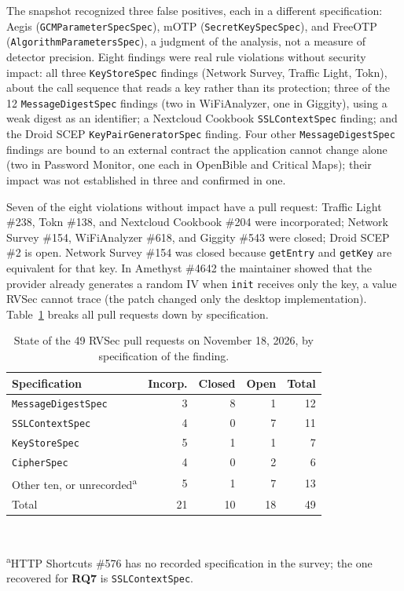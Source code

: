 \documentclass[conference]{IEEEtran}
\newcommand{\researchq}[1]{\textbf{RQ#1}}
\begin{document}
The snapshot recognized three false positives, each in a different
specification: Aegis (\texttt{GCMParameterSpecSpec}), mOTP
(\texttt{SecretKeySpecSpec}), and FreeOTP (\texttt{AlgorithmParametersSpec}),
a judgment of the analysis, not a measure of detector precision. Eight
findings were real rule violations without security impact: all three
\texttt{KeyStoreSpec} findings (Network Survey, Traffic Light, Tokn), about
the call sequence that reads a key rather than its protection; three of the 12
\texttt{MessageDigestSpec} findings (two in WiFiAnalyzer, one in Giggity),
using a weak digest as an identifier; a Nextcloud Cookbook
\texttt{SSLContextSpec} finding; and the Droid SCEP
\texttt{KeyPairGeneratorSpec} finding. Four other \texttt{MessageDigestSpec}
findings are bound to an external contract the application cannot change alone
(two in Password Monitor, one each in OpenBible and Critical Maps); their
impact was not established in three and confirmed in one.

Seven of the eight violations without impact have a pull request: Traffic
Light \#238, Tokn \#138, and Nextcloud Cookbook \#204 were incorporated;
Network Survey \#154, WiFiAnalyzer \#618, and Giggity \#543 were closed; Droid
SCEP \#2 is open. Network Survey \#154 was closed because \texttt{getEntry}
and \texttt{getKey} are equivalent for that key. In Amethyst \#4642 the
maintainer showed that the provider already generates a random IV when
\texttt{init} receives only the key, a value RVSec cannot trace (the patch
changed only the desktop implementation). Table~\ref{tab:pr-spec} breaks all
pull requests down by specification.

\begin{table}[H]
\centering
\caption{State of the 49 RVSec pull requests on November 18, 2026, by
specification of the finding.}
\label{tab:pr-spec}
\footnotesize
\begin{tabular}{lrrrr}
\toprule
Specification & Incorp. & Closed & Open & Total \\
\midrule
\texttt{MessageDigestSpec} & 3 & 8 & 1 & 12 \\
\texttt{SSLContextSpec}    & 4 & 0 & 7 & 11 \\
\texttt{KeyStoreSpec}      & 5 & 1 & 1 & 7 \\
\texttt{CipherSpec}        & 4 & 0 & 2 & 6 \\
Other ten, or unrecorded\textsuperscript{a} & 5 & 1 & 7 & 13 \\
\midrule
Total & 21 & 10 & 18 & 49 \\
\bottomrule
\end{tabular}
\\[2pt]\raggedright\scriptsize\textsuperscript{a}HTTP Shortcuts \#576 has no
recorded specification in the survey; the one recovered for \researchq{7} is \texttt{SSLContextSpec}.
\end{table}
\end{document}
